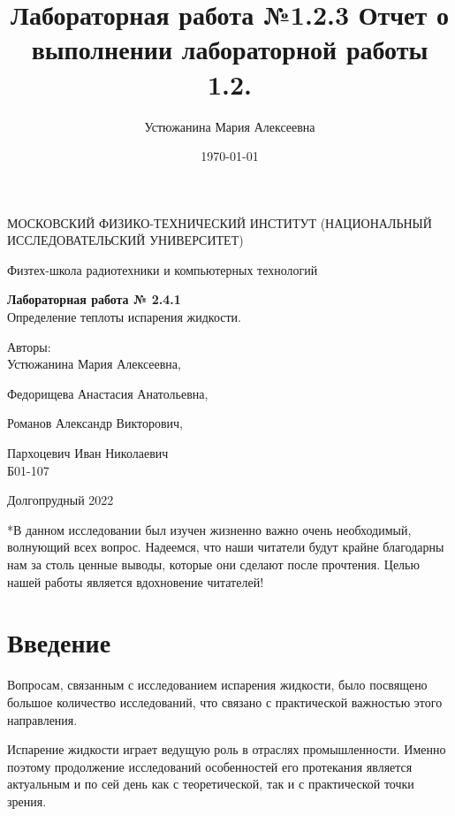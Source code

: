 \documentclass[a4paper,10pt]{article} %
\author{Устюжанина Мария Алексеевна}
\title{Лабораторная работа №1.2.3
Отчет о выполнении лабораторной работы 1.2.
}
\date{\today}
\begin{document}
\begin{titlepage}
	\begin{center}
		{\large МОСКОВСКИЙ ФИЗИКО-ТЕХНИЧЕСКИЙ ИНСТИТУТ (НАЦИОНАЛЬНЫЙ ИССЛЕДОВАТЕЛЬСКИЙ УНИВЕРСИТЕТ)}
	\end{center}
	\begin{center}
		{\large Физтех-школа радиотехники и компьютерных технологий}
	\end{center}
	
	
	\vspace{4cm}
	{\huge
		\begin{center}
			{\bf Лабораторная работа № 2.4.1}\\
			 Определение теплоты испарения жидкости.
		\end{center}
	}
	\vspace{3cm}
	\begin{flushright}
		{\LARGE Авторы:\\ Устюжанина Мария Алексеевна,

		Федорищева Анастасия Анатольевна, 

		Романов Александр Викторович, 

		Пархоцевич Иван Николаевич\\
			\vspace{0.3cm}
			Б01-107}
	\end{flushright}
	\vspace{4.5 cm}
	\begin{center}
		Долгопрудный 2022

	\vspace{1 cm}

		 *В данном исследовании был изучен жизненно важно очень необходимый, волнующий всех вопрос. Надеемся, что наши читатели будут крайне благодарны нам за столь ценные выводы, которые они сделают после прочтения. 
		 Целью нашей работы является вдохновение читателей!

	\end{center}
\end{titlepage}

\section{Введение}

Вопросам, связанным с исследованием испарения жидкости, было посвящено большое количество исследований, что связано с практической важностью этого направления. 

Испарение жидкости играет ведущую роль в отраслях промышленности. Именно поэтому продолжение исследований особенностей его протекания является актуальным и по сей день как с теоретической, так и с практической точки зрения.
\end{document}
